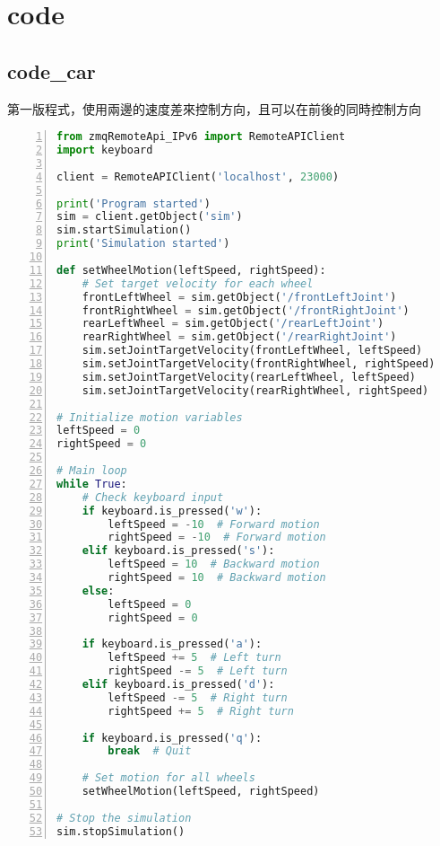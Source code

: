 ﻿\chapter{code}
\section{code\_car}
第一版程式，使用兩邊的速度差來控制方向，且可以在前後的同時控制方向\\
\begin{lstlisting}[language=Python, frame=single, numbers=left, captionpos=b, basicstyle=\ttfamily\small, showstringspaces=false, breaklines=true, tabsize=4, xleftmargin=15pt]
from zmqRemoteApi_IPv6 import RemoteAPIClient
import keyboard
 
client = RemoteAPIClient('localhost', 23000)
 
print('Program started')
sim = client.getObject('sim')
sim.startSimulation()
print('Simulation started')
 
def setWheelMotion(leftSpeed, rightSpeed):
    # Set target velocity for each wheel
    frontLeftWheel = sim.getObject('/frontLeftJoint')
    frontRightWheel = sim.getObject('/frontRightJoint')
    rearLeftWheel = sim.getObject('/rearLeftJoint')
    rearRightWheel = sim.getObject('/rearRightJoint')
    sim.setJointTargetVelocity(frontLeftWheel, leftSpeed)
    sim.setJointTargetVelocity(frontRightWheel, rightSpeed)
    sim.setJointTargetVelocity(rearLeftWheel, leftSpeed)
    sim.setJointTargetVelocity(rearRightWheel, rightSpeed)
 
# Initialize motion variables
leftSpeed = 0
rightSpeed = 0
 
# Main loop
while True:
    # Check keyboard input
    if keyboard.is_pressed('w'):
        leftSpeed = -10  # Forward motion
        rightSpeed = -10  # Forward motion
    elif keyboard.is_pressed('s'):
        leftSpeed = 10  # Backward motion
        rightSpeed = 10  # Backward motion
    else:
        leftSpeed = 0
        rightSpeed = 0
 
    if keyboard.is_pressed('a'):
        leftSpeed += 5  # Left turn
        rightSpeed -= 5  # Left turn
    elif keyboard.is_pressed('d'):
        leftSpeed -= 5  # Right turn
        rightSpeed += 5  # Right turn
         
    if keyboard.is_pressed('q'):
        break  # Quit
 
    # Set motion for all wheels
    setWheelMotion(leftSpeed, rightSpeed)
 
# Stop the simulation
sim.stopSimulation()
\end{lstlisting}
